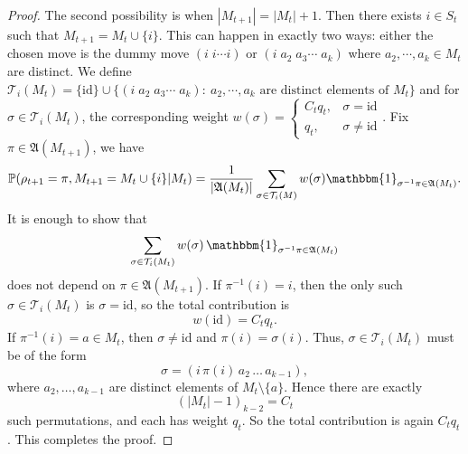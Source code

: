 \begin{proof}
        The second possibility is when $|M_{t+1}| = |M_t| + 1$. Then there exists $i\in S_t$ such that $M_{t+1}=M_t\cup\{i\}$. This can happen in exactly two ways: either the chosen move is the dummy move $(i\;i\cdots i)$ or $(i\;a_2\;a_3\cdots\;a_k)$ where $a_2,\cdots,a_k\in M_t$ are distinct. We define $\mathcal{T}_i(M_t)=\{\text{id}\}\cup\{(i\;a_2\;a_3\cdots\;a_k):~a_2,\cdots,a_k\text{ are distinct elements of } M_t\}$ and for $\sigma\in\mathcal{T}_i(M_t)$, the corresponding weight $w(\sigma)=\left\{\begin{array}{ll}C_tq_t, & \sigma =\text{id}  \\q_t, & \sigma \neq \text{id}\end{array}\right.$. Fix $\pi\in \mathfrak{A}(M_{t+1})$, we have 
        \begin{align*}
            \mathbb{P}(\rho_{t+1}=\pi,M_{t+1}=M_t\cup\{i\}|M_t) =\frac{1}{|\mathfrak{A}(M_{t})|}\sum_{\sigma\in\mathcal{T}_i(M)}w(\sigma)\mathbbm{1}_{\sigma^{-1}\pi\in \mathfrak{A}(M_{t})}.
        \end{align*}
It is enough to show that
\[
\sum_{\sigma\in \mathcal T_i(M_t)} w(\sigma)\,
\mathbbm{1}_{\sigma^{-1}\pi\in \mathfrak{A}(M_{t})}
\]
does not depend on \(\pi\in \mathfrak A(M_{t+1})\). If \(\pi^{-1}(i)=i\), then the only such \(\sigma\in\mathcal T_i(M_t)\) is
\(\sigma=\mathrm{id}\), so the total contribution is
\[
w(\mathrm{id})=C_t q_t.
\]
If \(\pi^{-1}(i)=a\in M_t\), then \(\sigma\neq \mathrm{id}\) and $\pi(i) = \sigma(i)$. Thus, $\sigma \in \mathcal T_i(M_t)$ must be of the form
\[
\sigma=(i\, \pi(i)\, a_2\,\dots\,a_{k-1}),
\]
where \(a_2,\dots,a_{k-1}\) are distinct elements of \(M_t\setminus\{a\}\).
Hence there are exactly
\[
(|M_t|-1)_{k-2}=C_t
\]
such permutations, and each has weight \(q_t\). So the total contribution is again $C_t q_t$. This completes the proof.
\end{proof}



